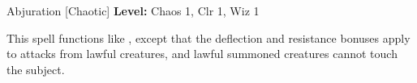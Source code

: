 {Abjuration [Chaotic]}
{
	\textbf{Level:}
	Chaos 1, Clr 1, Wiz 1\\
}
{
	This spell functions like , except that the deflection and resistance bonuses apply to attacks from lawful creatures, and lawful summoned creatures cannot touch the subject.

}
